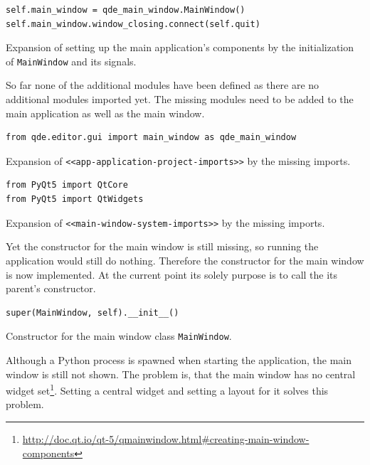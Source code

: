 \documentclass[10pt, openright, notitlepage]{scrreprt}
\begin{document}
\begin{listing}[H]
\begin{verbatim}
self.main_window = qde_main_window.MainWindow()
self.main_window.window_closing.connect(self.quit)
\end{verbatim}
\caption{\label{app-application-methods-setup-components}
Expansion of setting up the main application's components by the initialization of \texttt{MainWindow} and its signals.}
\end{listing}

So far none of the additional modules have been defined as there are no
additional modules imported yet. The missing modules need to be added to the
main application as well as the main window.

\begin{listing}[H]
\begin{verbatim}
from qde.editor.gui import main_window as qde_main_window
\end{verbatim}
\caption{\label{app-application-project-imports}
Expansion of \texttt{<<app-application-project-imports>>} by the missing imports.}
\end{listing}

\begin{listing}[H]
\begin{verbatim}
from PyQt5 import QtCore
from PyQt5 import QtWidgets
\end{verbatim}
\caption{\label{main-window-system-imports}
Expansion of \texttt{<<main-window-system-imports>>} by the missing imports.}
\end{listing}

Yet the constructor for the main window is still missing, so running the
application would still do nothing. Therefore the constructor for the main
window is now implemented. At the current point its solely purpose is to call
the its parent's constructor.

\begin{listing}[H]
\begin{verbatim}
super(MainWindow, self).__init__()
\end{verbatim}
\caption{\label{main-window-constructor}
Constructor for the main window class \texttt{MainWindow}.}
\end{listing}

Although a Python process is spawned when starting the application, the main
window is still not shown. The problem is, that the main window has no central
widget
set\footnote{\url{http://doc.qt.io/qt-5/qmainwindow.html\#creating-main-window-components}}.
Setting a central widget and setting a layout for it solves this problem.
\end{document}
